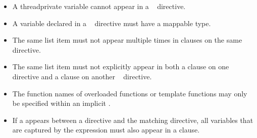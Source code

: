\restrictions
\begin{itemize}
\item A threadprivate variable cannot appear in a
      ~ directive.
\item A variable declared in a ~ directive
      must have a mappable type.
\item The same list item must not appear multiple times in clauses on 
      the same directive.
\item The same list item must not explicitly appear in both a  clause on one
      ~ directive and a  clause on
      another ~ directive.
\end{itemize}

\begin{cppspecific}
\begin{itemize}
\item The function names of overloaded functions or template functions
      may only be specified within an implicit .
\item If a  appears between a
       directive and the matching 
      directive, all variables that are captured by the  expression
      must also appear in a  clause.
\end{itemize}
\end{cppspecific}

